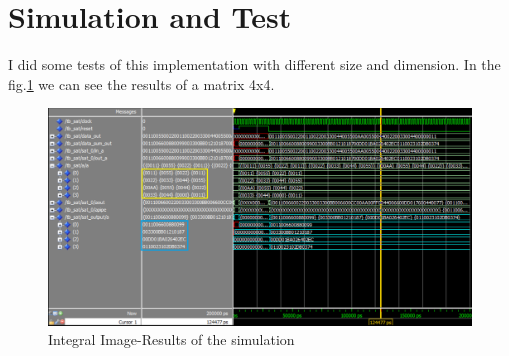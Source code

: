      \section{Simulation and Test}
     I did some tests of this implementation with different size and dimension. In the fig.\ref{fig:tb_iia} we can see the results of a matrix 4x4.
     
     \begin{figure}[h!]
     	\centering	
     	\includegraphics[width=\textwidth]{imm/iia/wave1.png}  
     	\caption{Integral Image-Results of the simulation} 
     	\label{fig:tb_iia}
     \end{figure}
     
